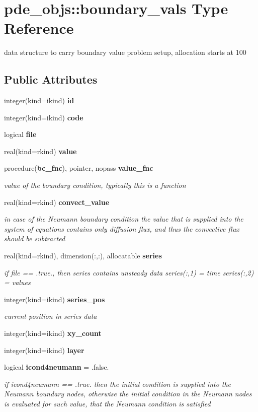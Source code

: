 \section{pde\+\_\+objs\+:\+:boundary\+\_\+vals Type Reference}
\label{structpde__objs_1_1boundary__vals}


data structure to carry boundary value problem setup, allocation starts at 100  


\subsection*{Public Attributes}
\begin{DoxyCompactItemize}
\item 
integer(kind=ikind) {\bf id}
\item 
integer(kind=ikind) {\bf code}
\item 
logical {\bf file}
\item 
real(kind=rkind) {\bf value}
\item 
procedure({\bf bc\+\_\+fnc}), pointer, nopass {\bf value\+\_\+fnc}
\begin{DoxyCompactList}\small\item\em value of the boundary condition, typically this is a function \end{DoxyCompactList}\item 
real(kind=rkind) {\bf convect\+\_\+value}
\begin{DoxyCompactList}\small\item\em in case of the Neumann boundary condition the value that is supplied into the system of equations contains only diffusion flux, and thus the convective flux should be subtracted \end{DoxyCompactList}\item 
real(kind=rkind), dimension(\+:,\+:), allocatable {\bf series}
\begin{DoxyCompactList}\small\item\em if file == .true., then series contains unsteady data series(\+:,1) = time series(\+:,2) = values \end{DoxyCompactList}\item 
integer(kind=ikind) {\bf series\+\_\+pos}
\begin{DoxyCompactList}\small\item\em current position in series data \end{DoxyCompactList}\item 
integer(kind=ikind) {\bf xy\+\_\+count}
\item 
integer(kind=ikind) {\bf layer}
\item 
logical {\bf icond4neumann} = .false.
\begin{DoxyCompactList}\small\item\em if icond4neumann == .true. then the initial condition is supplied into the Neumann boundary nodes, otherwise the initial condition in the Neumann nodes is evaluated for such value, that the Neumann condition is satisfied \end{DoxyCompactList}\end{DoxyCompactItemize}


